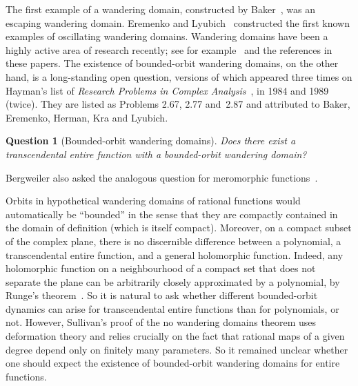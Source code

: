 \documentclass[12pt,a4paper,reqno]{amsart}
\theoremstyle{plain}
\newtheorem{question}[thm]{Question}
\theoremstyle{definition}
\theoremstyle{remark}
\numberwithin{equation}{section}
\newcommand{\lr}[1]{{\color{magenta} #1}}
\begin{document}
 The first example of a wandering domain,
  constructed by Baker~\cite{baker76},
  was an escaping wandering domain.
  Eremenko and Lyubich~\cite{eremenko-lyubich87} constructed the first
  known examples of oscillating
  wandering domains. Wandering domains have been a highly active area of research recently;
  see for example~\cite{befrs,bocthaler21,evdoridou-glucksam-pardosimon23,pardosimon-sixsmith24,martipete-rempe-waterman25,evdoridou-marti-pete-rempe26} and the references in these papers. The existence of bounded-orbit
  wandering domains, on the other hand,
  is a long-standing open question, 
  versions of which appeared three times on Hayman's
  list of \emph{Research Problems in Complex Analysis}~\cite{hayman-lingham19}, in 1984 and 1989 (twice).
  They are listed as Problems 2.67, 2.77 and~2.87 and attributed to Baker, Eremenko, Herman, Kra and Lyubich.

\begin{question}[Bounded-orbit wandering domains]\label{question:bounded-orbit}
 Does there exist a transcendental entire function with a bounded-orbit wandering domain?
\end{question}

\lr{Bergweiler also asked the analogous question for meromorphic functions~\cite[Question~8]{bergweiler93}.}

 Orbits in hypothetical wandering domains of rational functions would automatically be ``bounded'' in the sense that they are compactly contained in the domain of definition (which is itself compact). 
 Moreover, on a compact subset of the complex plane, there is no discernible difference between a polynomial,
 a transcendental entire
 function, and a general holomorphic function. Indeed, any 
 holomorphic function on a neighbourhood of a compact
 set that does not separate the plane can be arbitrarily
 closely approximated 
 by a polynomial, by Runge's theorem~\cite{runge85}. So 
 it is natural to ask whether different bounded-orbit
 dynamics can arise for
 transcendental entire functions than for polynomials,
 or not. However, Sullivan's proof of 
 the no wandering domains theorem uses deformation
 theory and 
  relies crucially on the fact that rational maps of a given degree depend only on finitely
  many parameters. So it remained unclear whether one should expect the existence of
   bounded-orbit wandering domains for entire functions. 
\end{document}
